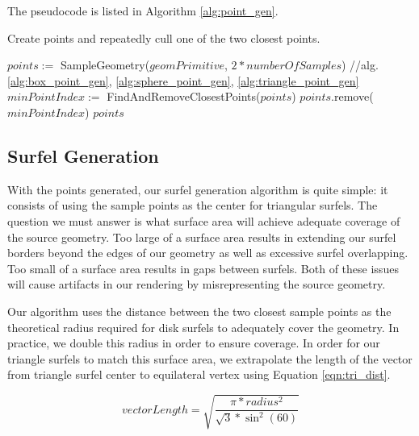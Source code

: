 The pseudocode is listed in Algorithm \ref{alg:point_gen}.

\begin{algorithm}
\captionfont
\caption[Create Points and Cull]{Create points and repeatedly cull one of the two closest points.}
\label{alg:point_gen}
{\fontsize{10}{9}\selectfont
\begin{algorithmic}
      \State $points :=$ SampleGeometry($geomPrimitive$, $2*numberOfSamples$) //alg. \ref{alg:box_point_gen}, \ref{alg:sphere_point_gen}, \ref{alg:triangle_point_gen}
         \State $minPointIndex :=$ FindAndRemoveClosestPoints($points$)
         \State $points$.remove($minPointIndex$)
      \EndWhile
      \State \Return $points$
   \EndFunction
\end{algorithmic}
}
\end{algorithm}

\subsection{Surfel Generation}
\label{sec:surfel_gen}

With the points generated, our surfel generation algorithm is quite simple: it consists of using the sample points as the center for triangular surfels. The question we must answer is what surface area will achieve adequate coverage of the source geometry. Too large of a surface area results in extending our surfel borders beyond the edges of our geometry as well as excessive surfel overlapping. Too small of a surface area results in gaps between surfels. Both of these issues will cause artifacts in our rendering by misrepresenting the source geometry.

Our algorithm uses the distance between the two closest sample points as the theoretical radius required for disk surfels to adequately cover the geometry. In practice, we double this radius in order to ensure coverage. In order for our triangle surfels to match this surface area, we extrapolate the length of the vector from triangle surfel center to equilateral vertex using Equation \ref{eqn:tri_dist}.

\begin{equation}
vectorLength = \sqrt{ \frac{ \pi * radius^2 }{ \sqrt{3} * \sin^2(60) } }
\label{eqn:tri_dist}
\end{equation}
~

